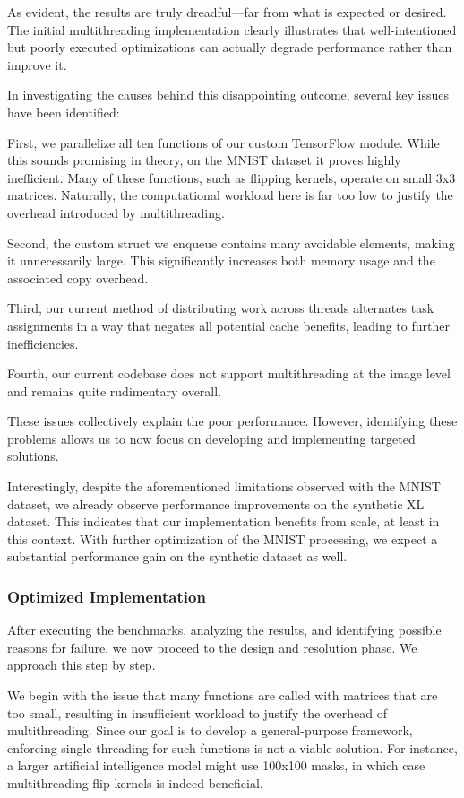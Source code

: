 \documentclass[modern,longauthor]{aastex7}
\begin{document}
As evident, the results are truly dreadful—far from what is expected or desired. The initial multithreading implementation clearly illustrates that well-intentioned but poorly executed optimizations can actually degrade performance rather than improve it.

In investigating the causes behind this disappointing outcome, several key issues have been identified:

First, we parallelize all ten functions of our custom TensorFlow module. While this sounds promising in theory, on the MNIST dataset it proves highly inefficient. Many of these functions, such as flipping kernels, operate on small 3x3 matrices. Naturally, the computational workload here is far too low to justify the overhead introduced by multithreading.

Second, the custom struct we enqueue contains many avoidable elements, making it unnecessarily large. This significantly increases both memory usage and the associated copy overhead.

Third, our current method of distributing work across threads alternates task assignments in a way that negates all potential cache benefits, leading to further inefficiencies.

Fourth, our current codebase does not support multithreading at the image level and remains quite rudimentary overall.

These issues collectively explain the poor performance. However, identifying these problems allows us to now focus on developing and implementing targeted solutions.

Interestingly, despite the aforementioned limitations observed with the MNIST dataset, we already observe performance improvements on the synthetic XL dataset. This indicates that our implementation benefits from scale, at least in this context. With further optimization of the MNIST processing, we expect a substantial performance gain on the synthetic dataset as well.
\subsubsection{Optimized Implementation}\label{subsec:optimized-implementation}
After executing the benchmarks, analyzing the results, and identifying possible reasons for failure, we now proceed to the design and resolution phase. We approach this step by step.

We begin with the issue that many functions are called with matrices that are too small, resulting in insufficient workload to justify the overhead of multithreading. Since our goal is to develop a general-purpose framework, enforcing single-threading for such functions is not a viable solution. For instance, a larger artificial intelligence model might use 100x100 masks, in which case multithreading flip kernels is indeed beneficial.
\end{document}
